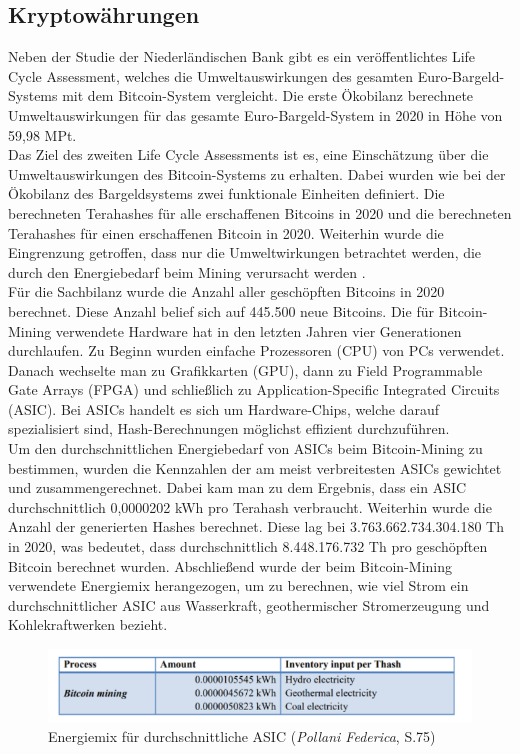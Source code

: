 \documentclass[12pt]{article}
\begin{document}
\subsection{Kryptowährungen}
Neben der Studie der Niederländischen Bank gibt es ein veröffentlichtes Life Cycle Assessment, welches die Umweltauswirkungen des gesamten Euro-Bargeld-Systems mit dem Bitcoin-System vergleicht. Die erste Ökobilanz berechnete Umweltauswirkungen für das gesamte Euro-Bargeld-System in 2020 in Höhe von 59,98 MPt.\\
Das Ziel des zweiten Life Cycle Assessments ist es, eine Einschätzung über die Umweltauswirkungen des Bitcoin-Systems zu erhalten. Dabei wurden wie bei der Ökobilanz des Bargeldsystems zwei funktionale Einheiten definiert. Die berechneten Terahashes für alle erschaffenen Bitcoins in 2020 und die berechneten Terahashes für einen erschaffenen Bitcoin in 2020. Weiterhin wurde die Eingrenzung getroffen, dass nur die Umweltwirkungen betrachtet werden, die durch den Energiebedarf beim Mining verursacht werden .\\
Für die Sachbilanz wurde die Anzahl aller geschöpften Bitcoins in 2020 berechnet. Diese Anzahl belief sich auf 445.500 neue Bitcoins. Die für Bitcoin-Mining verwendete Hardware hat in den letzten Jahren vier Generationen durchlaufen. Zu Beginn wurden einfache Prozessoren (CPU) von PCs verwendet. Danach wechselte man zu Grafikkarten (GPU), dann zu Field Programmable Gate Arrays (FPGA) und schließlich zu Application-Specific Integrated Circuits (ASIC). Bei ASICs handelt es sich um Hardware-Chips, welche darauf spezialisiert sind, Hash-Berechnungen möglichst effizient durchzuführen.\\
Um den durchschnittlichen Energiebedarf von ASICs beim Bitcoin-Mining zu bestimmen, wurden die Kennzahlen der am meist verbreitesten ASICs gewichtet und zusammengerechnet. Dabei kam man zu dem Ergebnis, dass ein ASIC durchschnittlich 0,0000202 kWh pro Terahash verbraucht. Weiterhin wurde die Anzahl der generierten Hashes berechnet. Diese lag bei 3.763.662.734.304.180 Th in 2020, was bedeutet, dass durchschnittlich 8.448.176.732 Th pro geschöpften Bitcoin berechnet wurden. Abschließend wurde der beim Bitcoin-Mining verwendete Energiemix herangezogen, um zu berechnen, wie viel Strom ein durchschnittlicher ASIC aus Wasserkraft, geothermischer Stromerzeugung und Kohlekraftwerken bezieht.
\FloatBarrier
\begin{figure}[ht!]
    \centering
    \includegraphics[width=.75\textwidth]{quellen/btc_mining_numbers.png}
    \caption[Energiemix für durchschnittliche ASIC]{Energiemix für durchschnittliche ASIC (\textit{Pollani Federica}, S.75)}
\end{figure}
\end{document}
